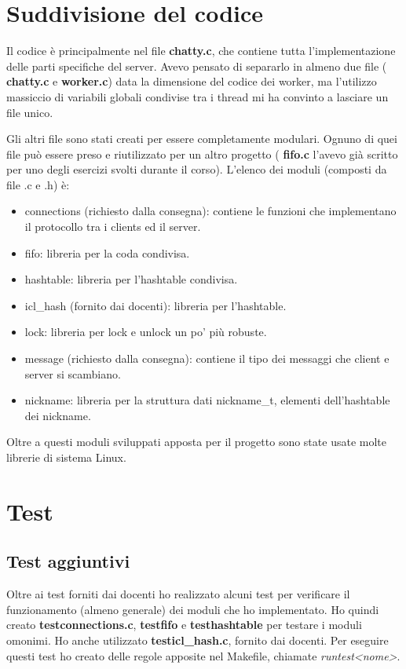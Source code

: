 \documentclass[a4paper]{article}
\theoremstyle{theorem}
\theoremstyle{remark}
\theoremstyle{definition}
\theoremstyle{corollary}
\theoremstyle{lemma}
\newcommand\file[1]{%
	\textbf{#1}}
\begin{document}
\section{Suddivisione del codice}
Il codice è principalmente nel file \file{chatty.c}, che contiene tutta l'implementazione delle parti specifiche del server. Avevo pensato di separarlo in almeno due file (\file{chatty.c} e \file{worker.c}) data la dimensione del codice dei worker, ma l'utilizzo massiccio di variabili globali condivise tra i thread mi ha convinto a lasciare un file unico.

Gli altri file sono stati creati per essere completamente modulari. Ognuno di quei file può essere preso e riutilizzato per un altro progetto (\file{fifo.c} l'avevo già scritto per uno degli esercizi svolti durante il corso). L'elenco dei moduli (composti da file .c e .h) è:
\begin{itemize}
	\item connections (richiesto dalla consegna): contiene le funzioni che implementano il protocollo tra i clients ed il server.
	\item fifo: libreria per la coda condivisa. 
	\item hashtable: libreria per l'hashtable condivisa.
	\item icl\_hash (fornito dai docenti): libreria per l'hashtable.
	\item lock: libreria per lock e unlock un po' più robuste.
	\item message (richiesto dalla consegna): contiene il tipo dei messaggi che client e server si scambiano.
	\item nickname: libreria per la struttura dati nickname\_t, elementi dell'hashtable dei nickname.
\end{itemize}

Oltre a questi moduli sviluppati apposta per il progetto sono state usate molte librerie di sistema Linux.

\section{Test}
\subsection{Test aggiuntivi}
Oltre ai test forniti dai docenti ho realizzato alcuni test per verificare il funzionamento (almeno generale) dei moduli che ho implementato. Ho quindi creato \file{testconnections.c}, \file{testfifo} e \file{testhashtable} per testare i moduli omonimi. Ho anche utilizzato \file{testicl\_hash.c}, fornito dai docenti. Per eseguire questi test ho creato delle regole apposite nel Makefile, chiamate \textit{runtest\textless nome\textgreater}.
\end{document}
